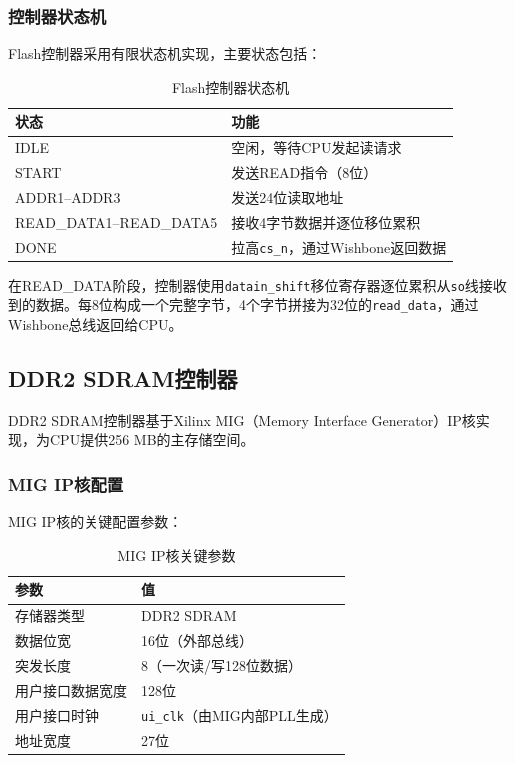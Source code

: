 \subsubsection{控制器状态机}

Flash控制器采用有限状态机实现，主要状态包括：

\begin{table}[H]
    \centering
    \caption{Flash控制器状态机}
    \begin{tabular}{ll}
        \toprule
        \textbf{状态} & \textbf{功能} \\
        \midrule
        IDLE & 空闲，等待CPU发起读请求 \\
        START & 发送READ指令（8位） \\
        ADDR1--ADDR3 & 发送24位读取地址 \\
        READ\_DATA1--READ\_DATA5 & 接收4字节数据并逐位移位累积 \\
        DONE & 拉高\texttt{cs\_n}，通过Wishbone返回数据 \\
        \bottomrule
    \end{tabular}
\end{table}

在READ\_DATA阶段，控制器使用\texttt{datain\_shift}移位寄存器逐位累积从\texttt{so}线接收到的数据。每8位构成一个完整字节，4个字节拼接为32位的\texttt{read\_data}，通过Wishbone总线返回给CPU。

\subsection{DDR2 SDRAM控制器}

DDR2 SDRAM控制器基于Xilinx MIG（Memory Interface Generator）IP核实现，为CPU提供256 MB的主存储空间。

\subsubsection{MIG IP核配置}

MIG IP核的关键配置参数：

\begin{table}[H]
    \centering
    \caption{MIG IP核关键参数}
    \begin{tabular}{ll}
        \toprule
        \textbf{参数} & \textbf{值} \\
        \midrule
        存储器类型 & DDR2 SDRAM \\
        数据位宽 & 16位（外部总线） \\
        突发长度 & 8（一次读/写128位数据） \\
        用户接口数据宽度 & 128位 \\
        用户接口时钟 & \texttt{ui\_clk}（由MIG内部PLL生成） \\
        地址宽度 & 27位 \\
        \bottomrule
    \end{tabular}
\end{table}

